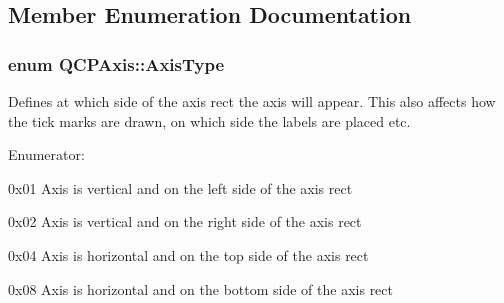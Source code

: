 \subsection{\-Member \-Enumeration \-Documentation}
\hypertarget{classQCPAxis_ae2bcc1728b382f10f064612b368bc18a}{
\subsubsection[{\-Axis\-Type}]{\setlength{\rightskip}{0pt plus 5cm}enum {\bf \-Q\-C\-P\-Axis\-::\-Axis\-Type}}}\label{classQCPAxis_ae2bcc1728b382f10f064612b368bc18a}
\-Defines at which side of the axis rect the axis will appear. \-This also affects how the tick marks are drawn, on which side the labels are placed etc. \begin{Desc}
\item[\-Enumerator\-: ]\par
\begin{description}
\item[{\em 
\hypertarget{classQCPAxis_ae2bcc1728b382f10f064612b368bc18aaf84aa6cac6fb6099f54a2cbf7546b730}{at\-Left}\label{classQCPAxis_ae2bcc1728b382f10f064612b368bc18aaf84aa6cac6fb6099f54a2cbf7546b730}
}]{\ttfamily 0x01} \-Axis is vertical and on the left side of the axis rect \item[{\em 
\hypertarget{classQCPAxis_ae2bcc1728b382f10f064612b368bc18aadf5509f7d29199ef2f263b1dd224b345}{at\-Right}\label{classQCPAxis_ae2bcc1728b382f10f064612b368bc18aadf5509f7d29199ef2f263b1dd224b345}
}]{\ttfamily 0x02} \-Axis is vertical and on the right side of the axis rect \item[{\em 
\hypertarget{classQCPAxis_ae2bcc1728b382f10f064612b368bc18aac0ece2b680d3f545e701f75af1655977}{at\-Top}\label{classQCPAxis_ae2bcc1728b382f10f064612b368bc18aac0ece2b680d3f545e701f75af1655977}
}]{\ttfamily 0x04} \-Axis is horizontal and on the top side of the axis rect \item[{\em 
\hypertarget{classQCPAxis_ae2bcc1728b382f10f064612b368bc18aa220d68888516b6c3b493d144f1ba438f}{at\-Bottom}\label{classQCPAxis_ae2bcc1728b382f10f064612b368bc18aa220d68888516b6c3b493d144f1ba438f}
}]{\ttfamily 0x08} \-Axis is horizontal and on the bottom side of the axis rect \end{description}
\end{Desc}

